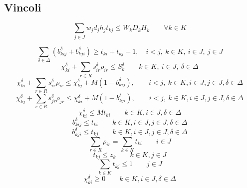 \documentclass{scrartcl}
\begin{document}
\subsection{Vincoli}
\begin{equation}
\sum_{j \in J} w_j d_j h_j t_{kj} \leq W_kD_kH_k \quad\quad \forall k \in K 
\end{equation}

\begin{equation}
\sum_{\delta\in\Delta}(b_{kij}^\delta + b_{kji}^\delta) \geq t_{ki} + t_{kj} - 1, \quad i < j,\ k \in K,\ i \in J,\ j \in J
\end{equation}
\begin{equation}
\chi_{ki}^\delta + \sum_{r \in R} s_{ir}^\delta \rho_{ir} \leq S_k^\delta \quad \quad k \in K,\ i \in J,\ \delta \in \Delta
\end{equation}
\begin{equation}
\chi_{ki}^\delta + \sum_{r \in R} s_{ir}^\delta \rho_{ir} \leq \chi_{kj}^\delta + M(1 - b_{kij}^\delta), \quad \quad i < j,\ k \in K, i \in J, j \in J, \delta \in \Delta
\end{equation}
\begin{equation}
\chi_{kj}^\delta + \sum_{r \in R} s_{jr}^\delta \rho_{jr} \leq \chi_{ki}^\delta + M(1 - b_{kji}^\delta), \quad \quad i < j,\ k \in K, i \in J, j \in J, \delta \in \Delta
\end{equation}
\begin{equation}
\chi_{ki}^\delta \leq M t_{ki}\quad\quad k \in K, i \in J, \delta \in \Delta
\end{equation}
\begin{equation}
b_{kij}^\delta \leq t_{ki}\quad \quad k \in K, i \in J, j \in J, \delta \in \Delta
\end{equation}
\begin{equation}
b_{kji}^\delta \leq t_{kj} \quad \quad k \in K, i \in J, j \in J, \delta \in \Delta
\end{equation}
\begin{equation}
\sum_{r \in R} \rho_{ir} = \sum_{k \in K} t_{ki}\quad \quad i \in J
\end{equation}
\begin{equation}
\label{constraint:multi:tkzk}
t_{kj} \leq z_k\quad \quad k \in K, j \in J
\end{equation}
\begin{equation}
\label{constraint:multi:onlyInOneKnapsack}
\sum_{k \in K} t_{kj} \leq 1 \quad \quad j \in J
\end{equation}
\begin{equation}
\chi_{ki}^\delta \geq 0 \quad \quad k \in K, i \in J, \delta \in \Delta
\end{equation}
\end{document}
